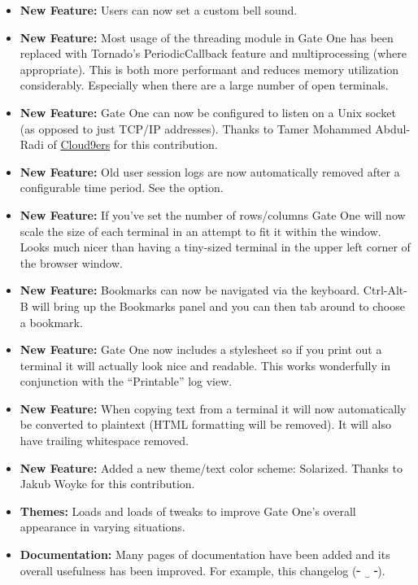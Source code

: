 \documentclass[letterpaper,10pt,openany]{sphinxmanual}
\begin{document}
\begin{itemize}
\item {} 
\textbf{New Feature:}  Users can now set a custom bell sound.

\item {} 
\textbf{New Feature:}  Most usage of the threading module in Gate One has been replaced with Tornado's PeriodicCallback feature and multiprocessing (where appropriate).  This is both more performant and reduces memory utilization considerably.  Especially when there are a large number of open terminals.

\item {} 
\textbf{New Feature:}  Gate One can now be configured to listen on a Unix socket (as opposed to just TCP/IP addresses).  Thanks to Tamer Mohammed Abdul-Radi of \href{http://cloud9ers.com/}{Cloud9ers} for this contribution.

\item {} 
\textbf{New Feature:}  Old user session logs are now automatically removed after a configurable time period.  See the  option.

\item {} 
\textbf{New Feature:}  If you've set the number of rows/columns Gate One will now scale the size of each terminal in an attempt to fit it within the window.  Looks much nicer than having a tiny-sized terminal in the upper left corner of the browser window.

\item {} 
\textbf{New Feature:}  Bookmarks can now be navigated via the keyboard.  Ctrl-Alt-B will bring up the Bookmarks panel and you can then tab around to choose a bookmark.

\item {} 
\textbf{New Feature:}  Gate One now includes a  stylesheet so if you print out a terminal it will actually look nice and readable.  This works wonderfully in conjunction with the ``Printable'' log view.

\item {} 
\textbf{New Feature:}  When copying text from a terminal it will now automatically be converted to plaintext (HTML formatting will be removed).  It will also have trailing whitespace removed.

\item {} 
\textbf{New Feature:}  Added a new theme/text color scheme:  Solarized.  Thanks to Jakub Woyke for this contribution.

\item {} 
\textbf{Themes:}  Loads and loads of tweaks to improve Gate One's overall appearance in varying situations.

\item {} 
\textbf{Documentation:}  Many pages of documentation have been added and its overall usefulness has been improved.  For example, this changelog (╴‿╶).

\end{itemize}
\end{document}
